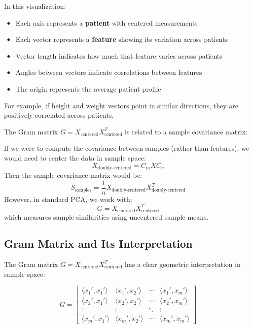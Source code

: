 \begin{notechapter}
\begin{remark}
In this visualization:
\begin{itemize}
    \item Each axis represents a \textbf{patient} with centered measurements
    \item Each vector represents a \textbf{feature} showing its variation across patients
    \item Vector length indicates how much that feature varies across patients
    \item Angles between vectors indicate correlations between features
    \item The origin represents the average patient profile
\end{itemize}

For example, if height and weight vectors point in similar directions, they are positively correlated across patients.
\end{remark}

\begin{theorem}
The Gram matrix $G = X_{\text{centered}} X_{\text{centered}}^T$ is related to a sample covariance matrix:

If we were to compute the covariance between samples (rather than features), we would need to center the data in sample space:
\[
X_{\text{doubly-centered}} = C_m X C_n
\]
Then the sample covariance matrix would be:
\[
S_{\text{samples}} = \frac{1}{n}X_{\text{doubly-centered}} X_{\text{doubly-centered}}^T
\]
However, in standard PCA, we work with:
\[
G = X_{\text{centered}} X_{\text{centered}}^T
\]
which measures sample similarities using uncentered sample means.
\end{theorem}

\subsection{Gram Matrix and Its Interpretation}

The Gram matrix $G = X_{\text{centered}} X_{\text{centered}}^T$ has a clear geometric interpretation in sample space:

\[
G = \begin{bmatrix}
\langle x_1', x_1' \rangle & \langle x_1', x_2' \rangle & \cdots & \langle x_1', x_m' \rangle \\
\langle x_2', x_1' \rangle & \langle x_2', x_2' \rangle & \cdots & \langle x_2', x_m' \rangle \\
\vdots & \vdots & \ddots & \vdots \\
\langle x_m', x_1' \rangle & \langle x_m', x_2' \rangle & \cdots & \langle x_m', x_m' \rangle
\end{bmatrix}
\]


\end{notechapter}

